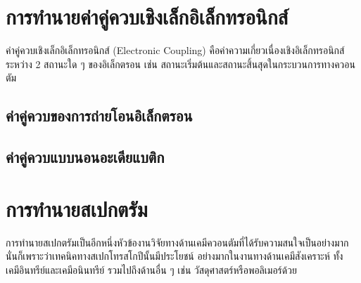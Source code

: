 \section{การทำนายค่าคู่ควบเชิงเล็กอิเล็กทรอนิกส์}
\label{sec:pred_elec_coupling}

ค่าคู่ควบเชิงเล็กอิเล็กทรอนิกส์ (Electronic Coupling) คือค่าความเกี่ยวเนื่องเชิงอิเล็กทรอนิกส์ระหว่าง 2 สถานะใด ๆ ของอิเล็กตรอน เช่น 
สถานะเริ่มต้นและสถานะสิ้นสุดในกระบวนการทางควอนตัม 

\subsection{ค่าคู่ควบของการถ่ายโอนอิเล็กตรอน}
\label{ssec:pred_etran_coupling}



\subsection{ค่าคู่ควบแบบนอนอะเดียแบติก}
\label{ssec:nonadia_coupling}



\section{การทำนายสเปกตรัม}
\label{sec:pred_spectra}

การทำนายสเปกตรัมเป็นอีกหนึ่งหัวข้องานวิจัยทางด้านเคมีควอนตัมที่ได้รับความสนใจเป็นอย่างมากนั่นก็เพราะว่าเทคนิคทางสเปกโทรสโกปีนั้นมีประโยชน์%
อย่างมากในงานทางด้านเคมีสังเคราะห์ ทั้งเคมีอินทรีย์และเคมีอนินทรีย์ รวมไปถึงด้านอื่น ๆ เช่น วัสดุศาสตร์หรือพอลิเมอร์ด้วย 

